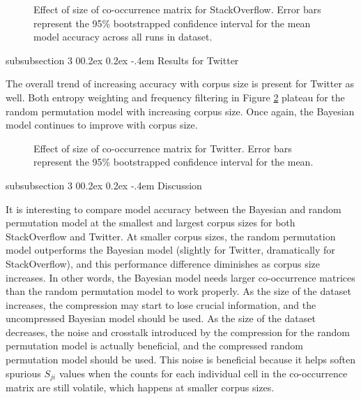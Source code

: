 \documentclass[man,floatsintext,donotrepeattitle]{apa6}
\makeatletter
\renewcommand{\subsubsection}{%
  \@startsection
  {subsubsection}%
  {3}%
  {\parindent}%
  {0\baselineskip \@plus 0.2ex \@minus 0.2ex}%
  {-.4em}%
  {\normalfont\normalsize\bfseries\addperi}}
\makeatother
\begin{document}
\begin{figure}[!htbp]
  \caption{
    Effect of size of co-occurrence matrix for StackOverflow.
    Error bars represent the 95\% bootstrapped confidence interval for the mean model accuracy across all runs in dataset.
  }
  \label{figContextDocumentSizeSO}
\end{figure}

\subsubsection{Results for Twitter}

The overall trend of increasing accuracy with corpus size is present for Twitter as well.
Both entropy weighting and frequency filtering in Figure \ref{figContextDocumentSizeT} plateau for the random permutation model with increasing corpus size.
Once again, the Bayesian model continues to improve with corpus size.

\begin{figure}[!htbp]
  \caption{
    Effect of size of co-occurrence matrix for Twitter.
    Error bars represent the 95\% bootstrapped confidence interval for the mean.
  }
  \label{figContextDocumentSizeT}
\end{figure}

\subsubsection{Discussion}

It is interesting to compare model accuracy between the Bayesian and random permutation model at the smallest and largest corpus sizes for both StackOverflow and Twitter.
At smaller corpus sizes, the random permutation model outperforms the Bayesian model (slightly for Twitter, dramatically for StackOverflow), and this performance difference diminishes as corpus size increases.
In other words, the Bayesian model needs larger co-occurrence matrices than the random permutation model to work properly.
As the size of the dataset increases, the compression may start to lose crucial information, and the uncompressed Bayesian model should be used.
As the size of the dataset decreases, the noise and crosstalk introduced by the compression for the random permutation model is actually beneficial, and the compressed random permutation model should be used. 
This noise is beneficial because it helps soften spurious $S_{ji}$ values when the counts for each individual cell in the co-occurrence matrix are still volatile, which happens at smaller corpus sizes.
\end{document}
